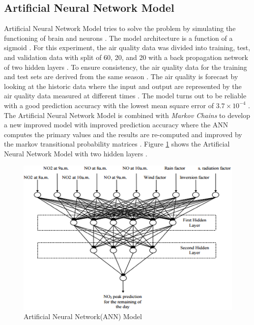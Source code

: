 \documentclass[sigconf]{acmart}
\begin{document}
\subsection{Artificial Neural Network Model}
Artificial Neural Network Model tries to solve the problem by simulating the functioning of brain and neurons \cite{gagan2017}. The model architecture is a function of a sigmoid \cite{gagan2017}. For this experiment, the air quality data was divided into training, test, and validation data with  split of 60, 20, and 20 with a back propagation network of two hidden layers \cite{gagan2017}. To ensure consistency, the air quality data for the training and test sets are derived from the same season \cite{gagan2017}. The air quality is forecast by looking at the historic data where the input and output are represented by the air quality data measured at different times \cite{gagan2017}. The model turns out to be reliable with a good prediction accuracy with the lowest mean square error of $3.7 \times 10^{-4}$ \cite{gagan2017}. The Artificial Neural Network Model is combined with {\em Markov Chains} to develop a new improved model with improved prediction accuracy where the ANN computes the primary values and the results are re-computed and improved by the markov transitional probability matrices \cite{gagan2017}. Figure \ref{fig:Fig7} shows the Artificial Neural Network Model with two hidden layers \cite{gagan2017}. 

\begin{figure}
\includegraphics[width=1.0\textwidth]{images/fig7.png}
\caption{Artificial Neural Network(ANN) Model \cite{gagan2017}}
\label{fig:Fig7}
\end{figure}
\end{document}
